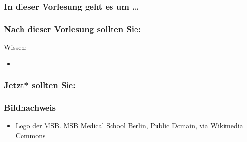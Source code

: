 \documentclass{beamer}
\begin{document}


 

\begin{frame}
\frametitle{In dieser Vorlesung geht es um \dots}

 
\end{frame}




\begin{frame}

\frametitle{Nach dieser Vorlesung sollten Sie:}



\begin{block}{Wissen:}
\begin{itemize}
\item
\end{itemize}
\end{block}

\end{frame}










\begin{frame}

\frametitle{Jetzt* sollten Sie:}



\end{frame}


\begin{frame}
\frametitle{Bildnachweis}


\begin{tiny}
 
\begin{itemize}


\item
Logo der MSB. MSB Medical School Berlin, Public Domain, via Wikimedia Commons

\end{itemize}

\end{tiny}
\end{frame}
\end{document}
